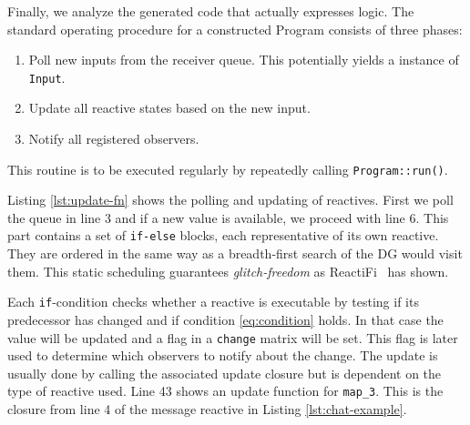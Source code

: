 Finally, we analyze the generated code that actually expresses \rerust logic. The standard operating procedure for a constructed Program consists of three phases:
\begin{enumerate}
    \item Poll new inputs from the receiver queue. This potentially yields a instance of \lstinline{Input}.
    \item Update all reactive states based on the new input.
    \item Notify all registered observers.
\end{enumerate}
This routine is to be executed regularly by repeatedly calling \lstinline{Program::run()}. 

Listing \ref{lst:update-fn} shows the polling and updating of reactives. First we poll the queue in line 3 and if a new value is available, we proceed with line 6. This part contains a set of \lstinline{if-else} blocks, each representative of its own reactive. They are ordered in the same way as a breadth-first search of the \ac{DG} would visit them. This static scheduling guarantees \emph{glitch-freedom} as ReactiFi~\citep{reactifi} has shown.

Each \lstinline{if}-condition checks whether a reactive is executable by testing if its predecessor has changed and if condition \ref{eq:condition} holds. In that case the value will be updated and a flag in a \lstinline{change} matrix will be set. This flag is later used to determine which observers to notify about the change. The update is usually done by calling the associated update closure but is dependent on the type of reactive used. Line 43 shows an update function for \lstinline{map_3}. This is the closure from line 4 of the message reactive in Listing \ref{lst:chat-example}.

